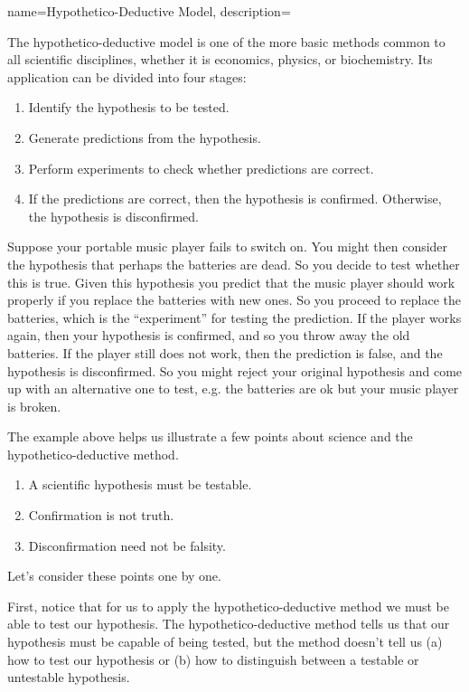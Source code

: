 {
name=Hypothetico-Deductive Model,
description={}
}

The hypothetico-deductive model is one of the more basic methods common to all scientific disciplines, whether it is economics, physics, or biochemistry. Its application can be divided into four stages:

\begin{enumerate}
\item Identify the hypothesis to be tested.
\item Generate predictions from the hypothesis.
\item Perform experiments to check whether predictions are correct.
\item If the predictions are correct, then the hypothesis is confirmed. Otherwise, the hypothesis is disconfirmed.
\end{enumerate}

Suppose your portable music player fails to switch on. You might then consider the hypothesis that perhaps the batteries are dead. So you decide to test whether this is true. Given this hypothesis you predict that the music player should work properly if you replace the batteries with new ones. So you proceed to replace the batteries, which is the ``experiment'' for testing the prediction. If the player works again, then your hypothesis is confirmed, and so you throw away the old batteries. If the player still does not work, then the prediction is false, and the hypothesis is disconfirmed. So you might reject your original hypothesis and come up with an alternative one to test, e.g. the batteries are ok but your music player is broken.

The example above helps us illustrate a few points about science and the hypothetico-deductive method.

\begin{enumerate}
\item A scientific hypothesis must be testable.
\item Confirmation is not truth.
\item Disconfirmation need not be falsity.
\end{enumerate}

Let's consider these points one by one.

First, notice that for us to apply the hypothetico-deductive method we must be able to test our hypothesis. The hypothetico-deductive method tells us that our hypothesis must be capable of being tested, but the method doesn't tell us (a) how to test our hypothesis or (b) how to distinguish between a testable or untestable hypothesis.


